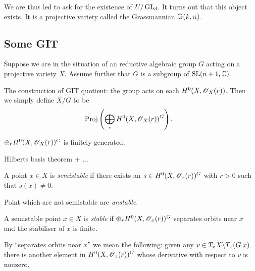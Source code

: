 \documentclass[11pt, english]{article}
\begin{document}
We are thus led to ask for the existence of $U/\operatorname{GL}_d$. It turns out that this object exists. It is a projective variety called the Grassmannian $\mathbb{G}(k,n)$.

\subsection{Some GIT}

\cite{thomas_git}

Suppose we are in the situation of an reductive algebraic group $G$  acting on a projective variety $X$. Assume further that $G$ is a subgroup of $\operatorname{SL}(n+1,\mathbb{C})$.

The construction of GIT quotient: the group acts on each $H^0(X,\operatorname{\mathscr{O}}_X(r))$. Then we simply define $X/G$ to be 
$$
\operatorname{Proj}\left(\bigoplus_r H^0(X,\operatorname{\mathscr{O}}_X(r))^G\right).
$$
\begin{lemma}
$\oplus_r H^0(X,\operatorname{\mathscr{O}}_X(r))^G$ is finitely generated.
\end{lemma}
\begin{lemma}
  Hilberts basis theorem + ...
\end{lemma}

\begin{defi}
A point $x \in X$ is \emph{semistable} if there exists an $s \in H^0(X,\operatorname{\mathscr{O}}_x(r))^G$ with $r > 0$ such that $s(x) \neq 0$.
\end{defi}
Point which are not semistable are \emph{unstable}. 

\begin{defi}
A semistable point $x \in X$ is \emph{stable} if $\oplus_r H^0(X,\operatorname{\mathscr{O}}_x(r))^G$ separates orbits near $x$ and the stabiliser of $x$ is finite.
\end{defi}
By ``separates orbits near $x$'' we mean the following: given any $v \in T_xX \backslash T_x(G.x)$ there is another element in $H^0(X,\operatorname{\mathscr{O}}_x(r))^G$ whose derivative with respect to $v$ is nonzero.


 
\end{document}
